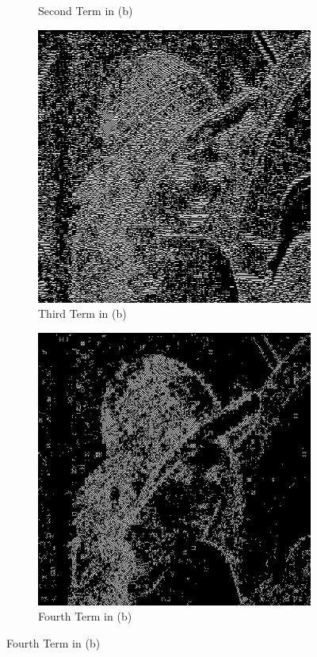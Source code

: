 \begin{figure}[H]
\begin{subfigure}[b]{0.45\textwidth}
        \caption{Second Term in (b)}
    \end{subfigure}
    \hfill
    \begin{subfigure}[b]{0.45\textwidth}
        \centering
        \includegraphics[width=\textwidth]{problem3/term3.bmp}
        \caption{Third Term in (b)}
    \end{subfigure}
    \hfill
    \begin{subfigure}[b]{0.45\textwidth}
        \centering
        \includegraphics[width=\textwidth]{problem3/term4.bmp}
        \caption{Fourth Term in (b)}
    \end{subfigure}
\end{figure}


